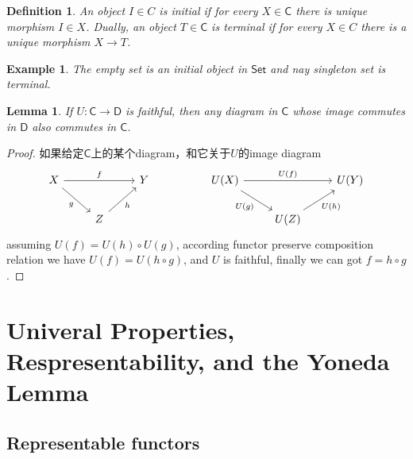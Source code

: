 \documentclass{article}
\newtheorem{lemma}[theorem]{Lemma}
\newtheorem{example}[theorem]{Example}
\newtheorem{definition}[theorem]{Definition}
\newcommand*{\cat}[1]{\textsf{#1}\xspace}
\newcommand{\Set}{\textsf{Set}\xspace}
\begin{document}
\begin{definition}
\rm An object $I \in C$ is initial if for every $X \in \cat{C}$ there is unique morphism $I \in X$. Dually, an object $T \in \cat{C}$ is terminal if for every $X \in C$ there is a unique morphism $X \to T$.  
\end{definition}

\begin{example}
\rm The empty set is an initial object in $\Set$ and nay singleton set is terminal. 
\end{example}

\begin{lemma}
\rm If $U:\cat{C} \to \cat{D}$ is faithful, then any diagram in $\cat{C}$ whose image commutes in $\cat{D}$ also commutes in $\cat{C}$.
\end{lemma}

\begin{proof}
如果给定$\cat{C}$上的某个diagram，和它关于$U$的image diagram
$$
\begin{tikzcd}
X \arrow[rr, "f"] \arrow[rd, "g"'] &                    & Y &  & U(X) \arrow[rr, "U(f)"] \arrow[rd, "U(g)"'] &                          & U(Y) \\
                                   & Z \arrow[ru, "h"'] &   &  &                                             & U(Z) \arrow[ru, "U(h)"'] &     
\end{tikzcd}
$$
assuming $U(f) = U(h) \circ U(g)$, according functor preserve composition relation we have $U(f) = U(h \circ g)$, and $U$ is faithful, finally we can got $f = h \circ g$. 
\end{proof}

\newpage
\section{Univeral Properties, Respresentability, and the Yoneda Lemma}


\subsection{Representable functors}
\end{document}
